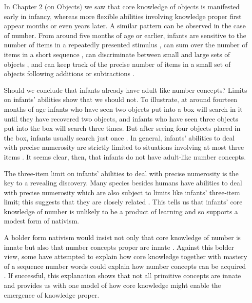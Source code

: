 \documentclass[12pt,\papersize]{extarticle}
\begin{document}
In Chapter 2 (on Objects) we saw that core knowledge of objects is manifested early in infancy, whereas more flexible abilities involving knowledge proper first appear months or even years later. 
A similar pattern can be observed in the case of number. 
From around five months of age or earlier, infants 
are sensitive to the number of items in a repeatedly presented stimulus \citep{starkey:1980_perception}, 
can sum over the number of items in a short sequence \citep{wynn:1996_infants}, 
can discriminate between small and large sets of objects \citep{xu:2000_large}, 
and can keep track of the precise number of items in a small set of objects following additions or subtractions \citep{wynn:1992_addition}. 

Should we conclude that infants already have adult-like number concepts?  
Limits on infants' abilities show that we should not. 
To illustrate, 
at around fourteen months of age infants who have seen two objects put into a box will search in it until they have recovered two objects, and infants who have seen three objects put into the box will search three times.
But after seeing four objects placed in the box, infants usually search just once \citep{feigenson_tracking_2003}. 
In general, infants' abilities to deal with precise numerosity are strictly limited to situations involving at most three items \citep{feigenson_tracking_2003}.
It seems clear, then, that infants do not have adult-like number concepts. 

The three-item limit on infants' abilities to deal with precise numerosity is the key to a revealing discovery.
Many species besides humans have abilities to deal with precise numerosity which are also subject to limits like infants' three-item limit; this suggests that they are  closely related \citep{hauser:2003_spontaneous}.  
This tells us that infants' core knowledge of number is unlikely to be a product of learning \citep{feigenson:2004_core} and so supports a modest form of nativism.

A bolder form nativism would insist not only that core knowledge of number is innate but also that number concepts proper are innate \citep{Fodor:1981ep}. 
Against this bolder view, some have attempted to explain how core knowledge together with mastery of a sequence number words could explain how number concepts can be acquired \citep{carey:2009_origin}. 
If successful, this explanation shows that not all primitive concepts are innate and provides us with one model of how core knowledge might enable the emergence of knowledge proper.
\end{document}
